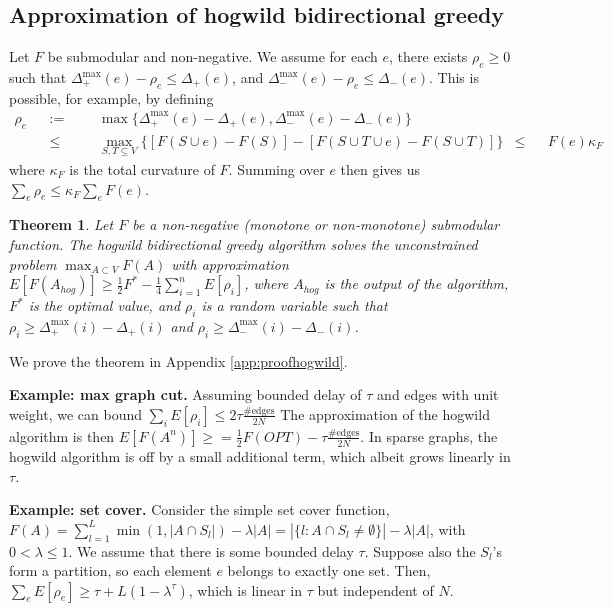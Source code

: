 \documentclass{article} %
\newtheorem{thm}{Theorem}[section]
\begin{document}
\subsection{Approximation of hogwild bidirectional greedy}
Let $F$ be submodular and non-negative.
We assume for each $e$, there exists $\rho_e \geq 0$ such that
$\Delta_+^{\max}(e) - \rho_e \leq \Delta_+(e)$, and
$\Delta_-^{\max}(e) - \rho_e \leq \Delta_-(e)$.
This is possible, for example, by defining
\begin{align*}
\rho_e
&&:=&&&   \max\{\Delta_+^{\max}(e) - \Delta_+(e), \Delta_-^{\max}(e) - \Delta_-(e)\}\\
&&\leq&&& \max_{S,T\subseteq V} \{[F(S\cup e) - F(S)] - [F(S \cup T \cup e) - F(S \cup T)]\}
&\leq&& F(e)\kappa_F
\end{align*}
where $\kappa_F$ is the total curvature of $F$.
Summing over $e$ then gives us $\sum_e \rho_e \leq \kappa_F\sum_e F(e)$.

\begin{thm}\label{thm:randomapprox} Let $F$ be a non-negative (monotone or non-monotone) submodular function.
The hogwild bidirectional greedy algorithm solves the unconstrained problem $\max_{A\subset V} F(A)$ with approximation
$
E[F(A_{hog})] \geq \frac{1}{2}F^* - \frac{1}{4}\sum_{i=1}^n E[\rho_i]$,
where $A_{hog}$ is the output of the algorithm, $F^*$ is the optimal value, and $\rho_i$ is a random variable such that $\rho_i \geq \Delta_+^{\max}(i) - \Delta_+(i)$ and $\rho_i \geq \Delta_-^{\max}(i) - \Delta_-(i)$.
\end{thm}

We prove the theorem in Appendix \ref{app:proofhogwild}.



\textbf{Example: max graph cut.}
Assuming bounded delay of $\tau$ and edges with unit weight, we can bound $\sum_i E[\rho_i] \leq 2\tau\frac{\text{\#edges}}{2N}$
The approximation of the hogwild algorithm is then $E[F(A^n)] \geq = \frac{1}{2} F(OPT) - \tau\frac{\#\text{edges}}{2N}$.
In sparse graphs, the hogwild algorithm is off by a small additional term, which albeit grows linearly in $\tau$.



\textbf{Example: set cover.}
Consider the simple set cover function,
$F(A) = \sum_{l=1}^L \min(1,|A\cap S_l|) - \lambda|A| = |\{l: A\cap S_l \neq\emptyset\}| - \lambda|A|$,
with $0 < \lambda \leq 1$.
We assume that there is some bounded delay $\tau$.
Suppose also the $S_l$'s form a partition, so each element $e$ belongs to exactly one set.
Then, $\sum_e E[\rho_e] \geq \tau + L(1-\lambda^\tau)$, which is linear in $\tau$ but independent of $N$.
\end{document}
